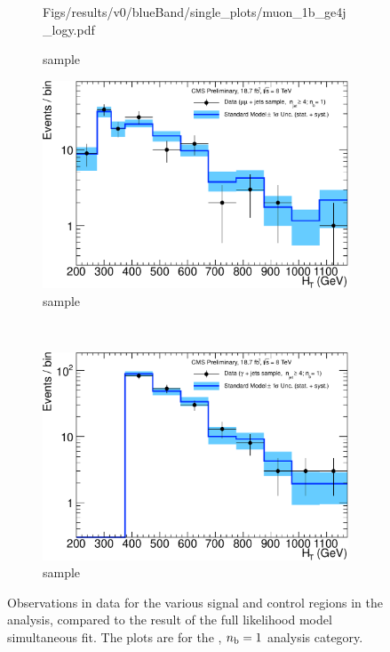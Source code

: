 \begin{figure}[h!]
\begin{subfigure}[b]{0.48\textwidth}
    {Figs/results/v0/blueBand/single_plots/muon_1b_ge4j_logy.pdf}
    \caption{\mj sample}
  \end{subfigure}
  \begin{subfigure}[b]{0.48\textwidth}
    \includegraphics[width=\textwidth]
    {Figs/results/v0/blueBand/single_plots/mumu_1b_ge4j_logy.pdf}
    \caption{\mmj sample}
  \end{subfigure}\\
  \begin{subfigure}[b]{0.48\textwidth}
    \includegraphics[width=\textwidth]
    {Figs/results/v0/blueBand/single_plots/photon_1b_ge4j_logy.pdf}
    \caption{\gj sample}
  \end{subfigure}
  \caption{Observations in data for the various signal and control
  regions in the analysis, compared to the result of the full likelihood model
  simultaneous fit. The plots are for the \njhigh, $n_{\text{b}} = 1$ analysis category.}
  \label{fig:blue_fits_1b_ge4j}
\end{figure}

